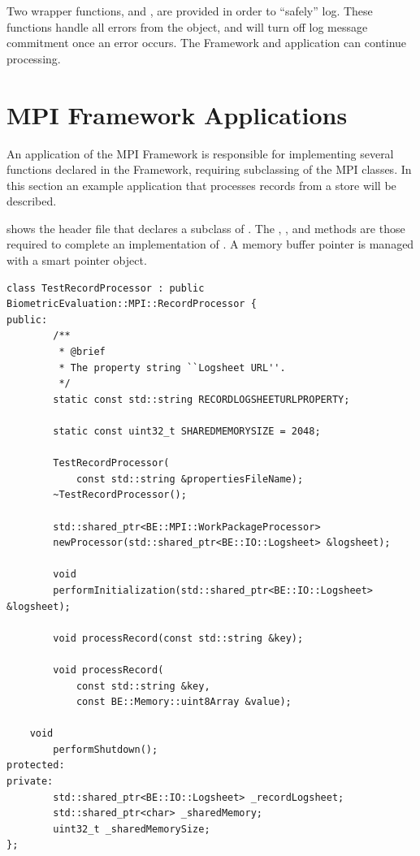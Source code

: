 Two wrapper functions,  and ,
are provided in order to ``safely'' log. These functions handle all errors
from the  object, and will turn off log message commitment
once an error occurs. The Framework and application can continue processing.

\section{MPI Framework Applications}
\label{sec-mpiapp}

An application of the MPI Framework is responsible for implementing several
functions declared in the Framework, requiring subclassing of the MPI classes.
In this section an example application that processes records from a store will
be described. 

 shows the header file that declares a subclass of
. The ,
, and  methods are those
required to complete an implementation of .
A memory buffer pointer is managed with a smart pointer object.

\begin{lstlisting}[caption={MPI Framework Application Classes}, label=lst:mpiappclasses]
class TestRecordProcessor : public BiometricEvaluation::MPI::RecordProcessor {
public:
        /**
         * @brief
         * The property string ``Logsheet URL''.
         */
        static const std::string RECORDLOGSHEETURLPROPERTY;

        static const uint32_t SHAREDMEMORYSIZE = 2048;

        TestRecordProcessor(
            const std::string &propertiesFileName);
        ~TestRecordProcessor();

        std::shared_ptr<BE::MPI::WorkPackageProcessor>
        newProcessor(std::shared_ptr<BE::IO::Logsheet> &logsheet);

        void
        performInitialization(std::shared_ptr<BE::IO::Logsheet> &logsheet);

        void processRecord(const std::string &key);

        void processRecord(
            const std::string &key,
            const BE::Memory::uint8Array &value);

	void
        performShutdown();
protected:
private:
        std::shared_ptr<BE::IO::Logsheet> _recordLogsheet;
        std::shared_ptr<char> _sharedMemory;
        uint32_t _sharedMemorySize;
};

\end{lstlisting}

